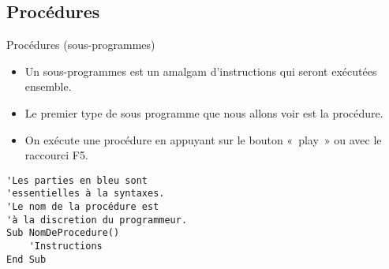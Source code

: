 \documentclass[aspectratio=169,usenames,dvipsnames]{beamer}
\begin{document}
    \subsection{Procédures}
    \begin{frame}[fragile]{Procédures (sous-programmes)}
        \begin{itemize}
            \item Un sous-programmes est un amalgam d’instructions qui seront exécutées ensemble.
            \item Le premier type de sous programme que nous allons voir est la procédure.
            \item On exécute une procédure en appuyant sur le bouton « play » ou avec le raccourci F5.
        \end{itemize}
        \begin{lstlisting}
'Les parties en bleu sont
'essentielles à la syntaxes.
'Le nom de la procédure est
'à la discretion du programmeur.
Sub NomDeProcedure()
    'Instructions
End Sub
        \end{lstlisting}
    \end{frame}
\end{document}
